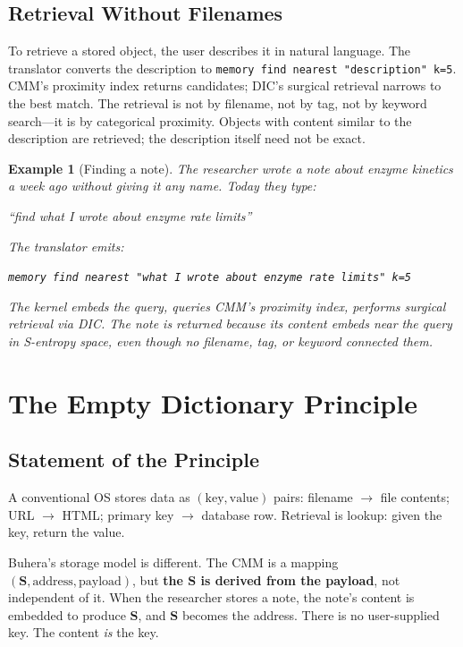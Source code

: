 \documentclass[11pt,twocolumn,a4paper]{article}
\newtheorem{example}[theorem]{Example}
\newcommand{\Scoord}{\mathbf{S}}
\begin{document}
\subsection{Retrieval Without Filenames}

To retrieve a stored object, the user describes it in natural language. The translator converts the description to \texttt{memory find nearest "description" k=5}. CMM's proximity index returns candidates; DIC's surgical retrieval narrows to the best match. The retrieval is not by filename, not by tag, not by keyword search---it is by categorical proximity. Objects with content similar to the description are retrieved; the description itself need not be exact.

\begin{example}[Finding a note]
The researcher wrote a note about enzyme kinetics a week ago without giving it any name. Today they type:
\begin{center}
\textit{``find what I wrote about enzyme rate limits''}
\end{center}
The translator emits:
\begin{center}
\texttt{memory find nearest "what I wrote about enzyme rate limits" k=5}
\end{center}
The kernel embeds the query, queries CMM's proximity index, performs surgical retrieval via DIC. The note is returned because its content embeds near the query in S-entropy space, even though no filename, tag, or keyword connected them.
\end{example}


\section{The Empty Dictionary Principle}
\label{sec:empty_dict}

\subsection{Statement of the Principle}

A conventional OS stores data as $(\text{key}, \text{value})$ pairs: filename $\to$ file contents; URL $\to$ HTML; primary key $\to$ database row. Retrieval is lookup: given the key, return the value.

Buhera's storage model is different. The CMM is a mapping $(\Scoord, \text{address}, \text{payload})$, but \textbf{the $\Scoord$ is derived from the payload}, not independent of it. When the researcher stores a note, the note's content is embedded to produce $\Scoord$, and $\Scoord$ becomes the address. There is no user-supplied key. The content \emph{is} the key.
\end{document}
